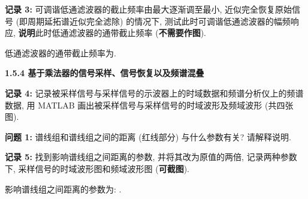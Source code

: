 \documentclass{dspreport}
\begin{document}
\begin{block}

\end{block}

\begin{figure}[H]
    \centering
\end{figure}

\begin{block}

\end{block}

\textbf{记录 3:} 可调谐低通滤波器的截止频率由最大逐渐调至最小, 近似完全恢复原始信号 (即周期延拓谱近似完全滤除) 的情况下, 测试此时可调谐低通滤波器的幅频响应, \textbf{说明}此时低通滤波器的通带截止频率 (\textbf{不需要作图}).

低通滤波器的通带截止频率为\underline{\blank{  }}.

\textbf{1.5.4 基于乘法器的信号采样、信号恢复以及频谱混叠}

\textbf{记录 4:} 记录被采样信号与采样信号的示波器上的时域数据和频谱分析仪上的频谱数据, 用 MATLAB 画出被采样信号与采样信号的时域波形及频域波形 (共四张图).

\begin{block}

\end{block}

\begin{figure}[H]
    \centering
\end{figure}

\begin{block}

\end{block}

\textbf{问题 1:} 谱线组和谱线组之间的距离 (红线部分) 与什么参数有关? 请解释说明.

\begin{block}

\end{block}

\textbf{记录 5:} 找到影响谱线组之间距离的参数, 并将其改为原值的两倍, 记录两种参数下, 采样信号的时域波形图和频域波形图 (\textbf{可截图}).

影响谱线组之间距离的参数为: \underline{\blank{  }}.

\begin{block}

\end{block}

\begin{figure}[H]
    \centering
\end{figure}
\end{document}
